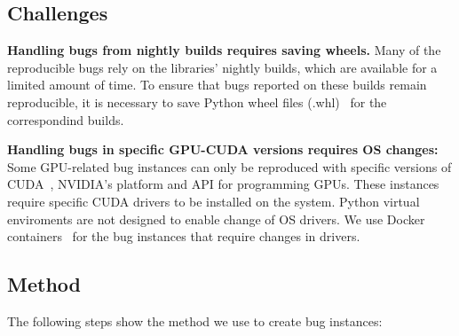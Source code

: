 \documentclass[sigconf,screen]{acmart}
\begin{document}
\subsection{Challenges}
\label{sec:challenges}

\textbf{Handling bugs from nightly builds requires saving wheels.}
Many of the reproducible bugs rely on the libraries' nightly builds,
which are available for a limited amount of time. To ensure that bugs
reported on these builds remain reproducible, it is necessary to save
Python wheel files (.whl)~\cite{wheels} for the correspondind builds.

\textbf{Handling bugs in specific GPU-CUDA versions requires OS
  changes:} Some GPU-related bug instances can only be reproduced with
specific versions of CUDA~\cite{cuda}, NVIDIA's platform and API for
programming GPUs. These instances require specific CUDA drivers to be
installed on the system. Python virtual enviroments are not designed
to enable change of OS drivers.
We use Docker containers~\cite{merkel2014docker} for the bug instances
that require changes in drivers.

\subsection{Method}
\label{sec:method}

The following steps show the method we use to create bug instances:
\end{document}
